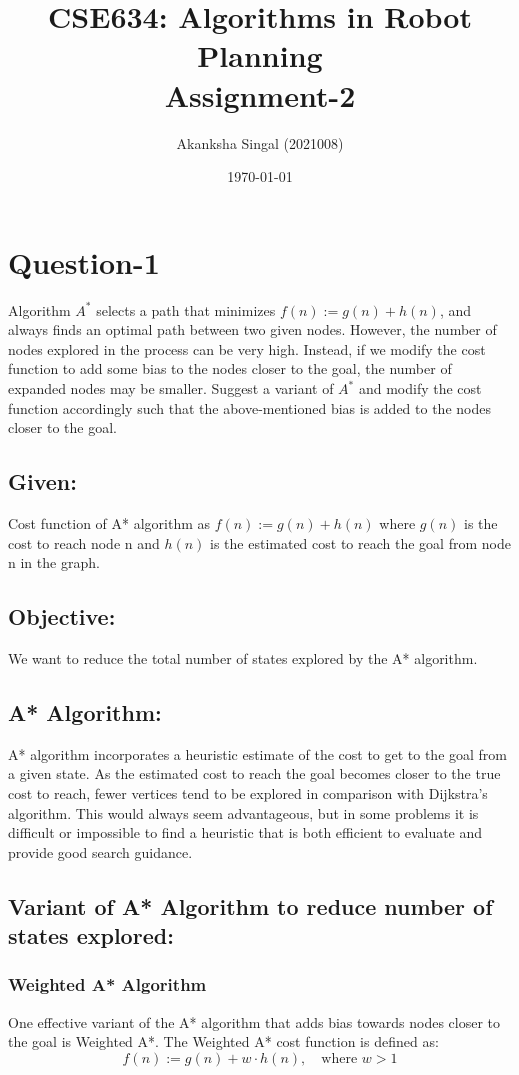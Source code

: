 \documentclass[11pt]{article}
\title{
    \textbf{CSE634: Algorithms in Robot Planning} \\ \vspace*{-5pt}
    \textbf{\large{Assignment-2}}
}
\author{Akanksha Singal (2021008)}
\date{\today}
\begin{document}
\maketitle

\section*{Question-1}
Algorithm $A^*$ selects a path that minimizes $f(n) := g(n) + h(n)$, and always finds an optimal path between two given nodes. However, the number of nodes explored in the process can be very high. Instead, if we modify the cost function to add some bias to the nodes closer to the goal, the number of expanded nodes may be smaller. Suggest a variant of $A^*$ and modify the cost function accordingly such that the above-mentioned bias is added to the nodes closer to the goal.


\subsection*{Given: }
Cost function of A* algorithm as $f(n) := g(n) + h(n)$ where $g(n)$ is the cost to reach node n and $h(n)$ is the estimated cost to reach the goal from node n in the graph.

\subsection*{Objective: }
We want to reduce the total number of states explored by the A* algorithm. 

\subsection*{A* Algorithm: }
A* algorithm incorporates a heuristic estimate of the cost to get to the goal from a given state.
As the estimated cost to reach the goal becomes closer to the true cost to reach, fewer vertices tend to be explored in comparison with Dijkstra’s algorithm.
This would always seem advantageous, but in some problems it is difficult or impossible to find a heuristic that is both efficient to evaluate and provide good search guidance.

\subsection*{Variant of A* Algorithm to reduce number of states explored: }

\subsubsection*{Weighted A* Algorithm}
One effective variant of the A* algorithm that adds bias towards nodes closer to the goal is Weighted A*. 
\newline
The Weighted A* cost function is defined as:
\[
f(n) := g(n) + w \cdot h(n), \quad \text{where } w > 1
\]
\end{document}
